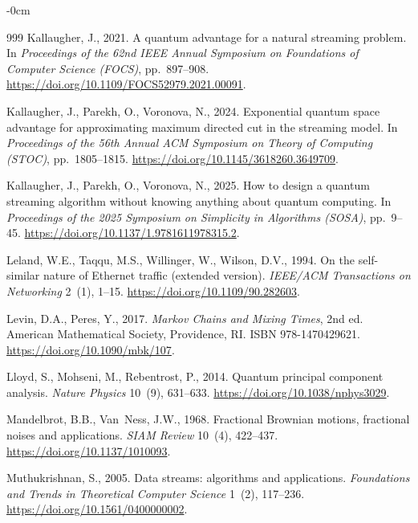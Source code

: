 \documentclass[sensors,article,submit,pdftex,moreauthors]{Definitions/mdpi}
\begin{document}
\begin{adjustwidth}{-\extralength}{0cm}
\begin{thebibliography}{999}
Kallaugher, J., 2021.
\newblock A quantum advantage for a natural streaming problem.
\newblock In \emph{Proceedings of the 62nd IEEE Annual Symposium on Foundations of Computer Science (FOCS)}, pp.~897--908.
\newblock \url{https://doi.org/10.1109/FOCS52979.2021.00091}.

Kallaugher, J., Parekh, O., Voronova, N., 2024.
\newblock Exponential quantum space advantage for approximating maximum directed cut in the streaming model.
\newblock In \emph{Proceedings of the 56th Annual ACM Symposium on Theory of Computing (STOC)}, pp.~1805--1815.
\newblock \url{https://doi.org/10.1145/3618260.3649709}.

Kallaugher, J., Parekh, O., Voronova, N., 2025.
\newblock How to design a quantum streaming algorithm without knowing anything about quantum computing.
\newblock In \emph{Proceedings of the 2025 Symposium on Simplicity in Algorithms (SOSA)}, pp.~9--45.
\newblock \url{https://doi.org/10.1137/1.9781611978315.2}.

Leland, W.E., Taqqu, M.S., Willinger, W., Wilson, D.V., 1994.
\newblock On the self-similar nature of Ethernet traffic (extended version).
\newblock \emph{IEEE/ACM Transactions on Networking} 2~(1), 1--15.
\newblock \url{https://doi.org/10.1109/90.282603}.

Levin, D.A., Peres, Y., 2017.
\newblock \emph{Markov Chains and Mixing Times}, 2nd ed.
\newblock American Mathematical Society, Providence, RI. ISBN 978-1470429621.
\newblock \url{https://doi.org/10.1090/mbk/107}.

Lloyd, S., Mohseni, M., Rebentrost, P., 2014.
\newblock Quantum principal component analysis.
\newblock \emph{Nature Physics} 10~(9), 631--633.
\newblock \url{https://doi.org/10.1038/nphys3029}.

Mandelbrot, B.B., Van~Ness, J.W., 1968.
\newblock Fractional Brownian motions, fractional noises and applications.
\newblock \emph{SIAM Review} 10~(4), 422--437.
\newblock \url{https://doi.org/10.1137/1010093}.

Muthukrishnan, S., 2005.
\newblock Data streams: algorithms and applications.
\newblock \emph{Foundations and Trends in Theoretical Computer Science} 1~(2), 117--236.
\newblock \url{https://doi.org/10.1561/0400000002}.


\end{thebibliography}
\end{adjustwidth}
\end{document}
